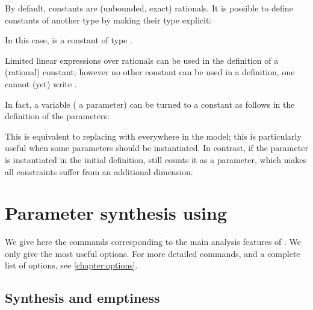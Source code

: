 By default, constants are (unbounded, exact) rationals.
It is possible to define constants of another type by making their type explicit:

\begin{center}
\end{center}

In this case,  is a constant of type .

Limited linear expressions over rationals can be used in the definition of a (rational) constant; however no other constant can be used in a definition, \ie{} one cannot (yet) write .


\begin{hint}
	In fact, a variable (\eg{} a parameter) can be turned to a constant as follows in the definition of the parameters:
	\begin{center}
	\end{center}
	This is equivalent to replacing  with  everywhere in the model; this is particularly useful when some parameters should be instantiated.
	In contrast, if the parameter is instantiated in the initial definition, \imitator{} still counts it as a parameter, which makes all constraints suffer from an additional dimension.
\end{hint}





\chapter{Parameter synthesis using \imitator{}}


We give here the commands corresponding to the main analysis features of \imitator{}.
We only give the most useful options.
For more detailed commands, and a complete list of options, see \cref{chapter:options}.

\section{Synthesis and emptiness}

